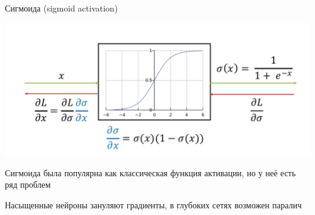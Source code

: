\documentclass[notes,12pt, aspectratio=169]{beamer}
\begin{document}
\begin{frame}{Сигмоида (sigmoid activation)}
\begin{center}
	\includegraphics[width=.65\linewidth]{sigmoid_activation_2.png}
\end{center}

\begin{itemize}
	\item Сигмоида была популярна как классическая функция активации, но у неё есть ряд проблем
	{\color{red} 
	\item Насыщенные нейроны зануляют градиенты, в глубоких сетях возможен паралич
	}
\end{itemize}
\end{frame}
\end{document}
